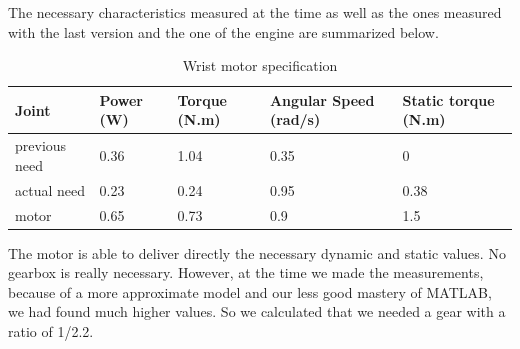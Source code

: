 \bigbreak
The necessary characteristics measured at the time as well as the ones measured with the last version and the one of the engine are summarized below.
\begin{table}[ht]
    \centering
    \begin{tabular}{|p{1.5cm} | p{2cm} | p{2.5cm}| p{2.7cm} | p{2.7cm} |} 
        \hline
        \textbf{Joint}& \textbf{Power (W)} & \textbf{Torque (N.m)} & \textbf{Angular Speed (rad/s)} & \textbf{Static torque (N.m)}\\ [0.3ex]
        \hline
        previous need & 0.36 & 1.04 & 0.35 & 0 \\ 
        \hline
        actual need & 0.23 & 0.24 & 0.95 & 0.38 \\ 
        \hline
        motor & 0.65 & 0.73 & 0.9 & 1.5\\ 
        \hline
    \end{tabular}
    \caption{Wrist motor specification}
\end{table}
\FloatBarrier
The motor is able to deliver directly the necessary dynamic and static values. No gearbox is really necessary. However, at the time we made the measurements, because of a more approximate model and our less good mastery of MATLAB, we had found much higher values. So we calculated that we needed a gear with a ratio of 1/2.2.